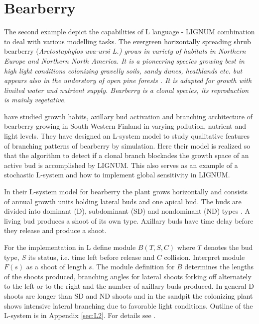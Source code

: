 \section{Bearberry}\label{sec:bearberry}

The  second example  depict the  capabilities of  L language  - LIGNUM
combination  to  deal with  various  modelling  tasks.  The  evergreen
horizontally  spreading shrub  bearberry (\it  Arctostaphylos uva-ursi
\rm L.)  grows in variety  of habitats in Northern Europe and Northern
North America.  It is a  pioneering species growing best in high light
conditions  colonizing gravelly  soils, sandy  dunes,  heathlands etc.
but   appears  also   in   the  understory   of   open  pine   forests
\citep{salemaa:99}.  It  is adapted for growth with  limited water and
nutrient supply.   Bearberry is a clonal species,  its reproduction is
mainly vegetative.

\citet{salemaa:02} have studied growth habits, axillary bud activation
and  branching  architecture of  bearberry  growing  in South  Western
Finland in  varying pollution, nutrient  and light levels.   They have
designed an L-system model  to study qualitative features of branching
patterns of bearberry by simulation.   Here their model is realized so
that the algorithm  to detect if a clonal  branch blockades the growth
space of an active bud is  accomplished by LIGNUM. This also serves as
an example of a stochastic L-system \citep{pp:90} and how to implement
global sensitivity \citep{kurth:94} in LIGNUM.

In  their L-system  model for  bearberry \citep{salemaa:02}  the plant
grows horizontally and consists of annual growth units holding lateral
buds  and one apical  bud.  The  buds are  divided into  dominant (D),
subdominant  (SD) and nondominant  (ND) types  \citep{remphrey:83}.  A
living bud produces a shoot of  its own type.  Axillary buds have time
delay before they release and produce a shoot.

For the implementation in L define module $B(T,S,C)$ where $T$ denotes
the bud type,  $S$ its status, i.e.  time left  before release and $C$
collision.  Interpret  module $F(s)$  as a shoot  of length  $s$.  The
module  definition  for  $B$  determines  the lengths  of  the  shoots
produced, branching angles for  lateral shoots forking off alternately
to the left or to the  right and the number of axillary buds produced.
In  general D  shoots are  longer than  SD and  ND shoots  and  in the
sandpit the colonizing plant  shows intensive lateral branching due to
favorable light  conditions.  Outline of  the L-system is  in Appendix
\ref{sec:L2}.  For details see \citet{salemaa:02}.

